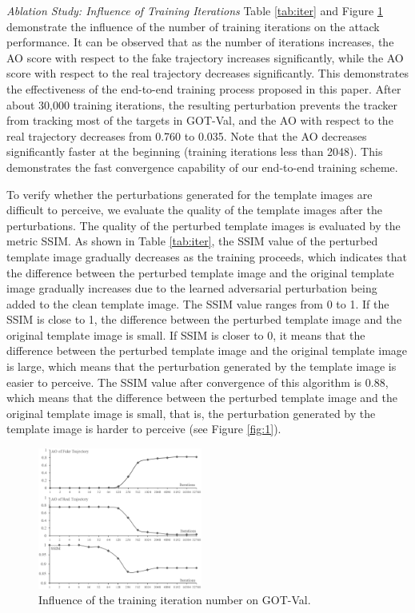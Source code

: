 \documentclass[journal]{IEEEtran}
\begin{document}
\textit{Ablation Study: Influence of Training Iterations} Table \ref{tab:iter} and Figure \ref{fig:iter} demonstrate the influence of the number of training iterations on the attack performance. It can be observed that as the number of iterations increases, the AO score with respect to the fake trajectory increases significantly, while the AO score with respect to the real trajectory decreases significantly. This demonstrates the effectiveness of the end-to-end training process proposed in this paper. After about 30,000 training iterations, the resulting perturbation prevents the tracker from tracking most of the targets in GOT-Val, and the AO with respect to the real trajectory decreases from 0.760 to 0.035. Note that the AO decreases significantly faster at the beginning (training iterations less than 2048). This demonstrates the fast convergence capability of our end-to-end training scheme.

To verify whether the perturbations generated for the template images are difficult to perceive, we evaluate the quality of the template images after the perturbations. The quality of the perturbed template images is evaluated by the metric SSIM. As shown in Table \ref{tab:iter}, the SSIM value of the perturbed template image gradually decreases as the training proceeds, which indicates that the difference between the perturbed template image and the original template image gradually increases due to the learned adversarial perturbation being added to the clean template image. The SSIM value ranges from 0 to 1. If the SSIM is close to 1, the difference between the perturbed template image and the original template image is small. If SSIM is closer to 0, it means that the difference between the perturbed template image and the original template image is large, which means that the perturbation generated by the template image is easier to perceive. The SSIM value after convergence of this algorithm is 0.88, which means that the difference between the perturbed template image and the original template image is small, that is, the perturbation generated by the template image is harder to perceive (see Figure \ref{fig:1}).

\begin{figure}[t]
  \centering
  \includegraphics[width=0.48\textwidth]{images/iter.png}
  \caption{Influence of the training iteration number on GOT-Val.} 
  \label{fig:iter}
\end{figure}
\end{document}
